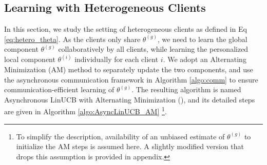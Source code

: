 \subsection{Learning with Heterogeneous Clients}
\label{subsec:async_LinUCB_AM}
In this section, we study the setting of heterogeneous clients as defined in Eq \eqref{eq:hetero_theta}. 
As the clients only share $\theta^{(g)}$, we need to learn the global component $\theta^{(g)}$ collaboratively by all clients, while learning the personalized local component $\theta^{(i)}$ individually for each client $i$.
We adopt an Alternating Minimization (AM) method to separately update the two components, and use the asynchronous communication framework in Algorithm \ref{algo:comm} to ensure communication-efficient learning of $\theta^{(g)}$. The resulting algorithm is named Asynchronous LinUCB with Alternating Minimization (\modeltwo{}), and its detailed steps are given in Algorithm \ref{algo:AsyncLinUCB_AM} \footnote{To simplify the description, availability of an unbiased estimate of $\theta^{(g)}$ to initialize the AM steps is assumed here. A slightly modified version that drops this assumption is provided in appendix.}.

